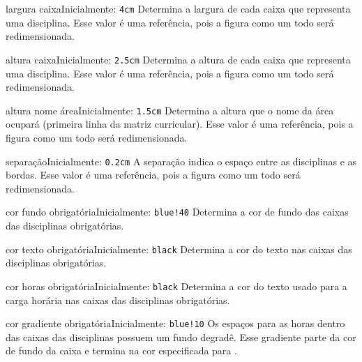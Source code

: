 \documentclass[a4paper, 11pt]{article}
\begin{document}
\begin{Optiondef}{largura caixa}{}{Inicialmente: \texttt{4cm}}
    Determina a largura de cada caixa que representa uma disciplina. Esse valor é uma referência, pois a figura como um todo será redimensionada.
\end{Optiondef}

\begin{Optiondef}{altura caixa}{}{Inicialmente: \texttt{2.5cm}}
    Determina a altura de cada caixa que representa uma disciplina. Esse valor é uma referência, pois a figura como um todo será redimensionada.
\end{Optiondef}

\begin{Optiondef}{altura nome área}{}{Inicialmente: \texttt{1.5cm}}
    Determina a altura que o nome da área ocupará (primeira linha da matriz curricular). Esse valor é uma referência, pois a figura como um todo será redimensionada.
\end{Optiondef}

\begin{Optiondef}{separação}{}{Inicialmente: \texttt{0.2cm}}
    A separação indica o espaço entre as disciplinas e as bordas. Esse valor é uma referência, pois a figura como um todo será redimensionada.
\end{Optiondef}

\begin{Optiondef}{cor fundo obrigatória}{}{Inicialmente: \texttt{blue!40}}
    Determina a cor de fundo das caixas das disciplinas obrigatórias.
\end{Optiondef}

\begin{Optiondef}{cor texto obrigatória}{}{Inicialmente: \texttt{black}}
    Determina a cor do texto nas caixas das disciplinas obrigatórias.
\end{Optiondef}

\begin{Optiondef}{cor horas obrigatória}{}{Inicialmente: \texttt{black}}
    Determina a cor do texto usado para a carga horária nas caixas das disciplinas obrigatórias.
\end{Optiondef}

\begin{Optiondef}{cor gradiente obrigatória}{}{Inicialmente: \texttt{blue!10}}
    Os espaços para as horas dentro das caixas das disciplinas possuem um fundo degradê. Esse gradiente parte da cor de fundo da caixa e termina na cor especificada para .
\end{Optiondef}
\end{document}

